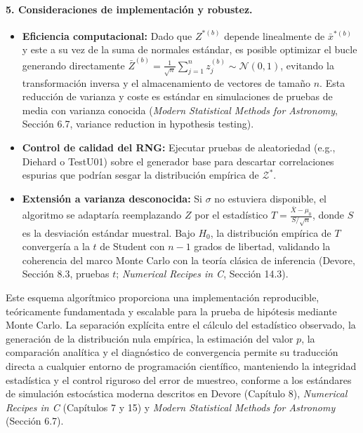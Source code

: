 \documentclass[12pt]{article}
\begin{document}
\paragraph{5. Consideraciones de implementación y robustez.}
\begin{itemize}
    \item \textbf{Eficiencia computacional:} Dado que $Z^{*(b)}$ depende linealmente de $\bar{x}^{*(b)}$ y este a su vez de la suma de normales estándar, es posible optimizar el bucle generando directamente $\bar{Z}^{(b)} = \frac{1}{\sqrt{n}} \sum_{j=1}^n z_j^{(b)} \sim \mathcal{N}(0,1)$, evitando la transformación inversa y el almacenamiento de vectores de tamaño $n$. Esta reducción de varianza y coste es estándar en simulaciones de pruebas de media con varianza conocida (\textit{Modern Statistical Methods for Astronomy}, Sección 6.7, variance reduction in hypothesis testing).
    \item \textbf{Control de calidad del RNG:} Ejecutar pruebas de aleatoriedad (e.g., Diehard o TestU01) sobre el generador base para descartar correlaciones espurias que podrían sesgar la distribución empírica de $\mathcal{Z}^*$.
    \item \textbf{Extensión a varianza desconocida:} Si $\sigma$ no estuviera disponible, el algoritmo se adaptaría reemplazando $Z$ por el estadístico $T = \frac{\bar{X} - \mu_0}{S/\sqrt{n}}$, donde $S$ es la desviación estándar muestral. Bajo $H_0$, la distribución empírica de $T$ convergería a la $t$ de Student con $n-1$ grados de libertad, validando la coherencia del marco Monte Carlo con la teoría clásica de inferencia (Devore, Sección 8.3, pruebas $t$; \textit{Numerical Recipes in C}, Sección 14.3).
\end{itemize}

Este esquema algorítmico proporciona una implementación reproducible, teóricamente fundamentada y escalable para la prueba de hipótesis mediante Monte Carlo. La separación explícita entre el cálculo del estadístico observado, la generación de la distribución nula empírica, la estimación del valor $p$, la comparación analítica y el diagnóstico de convergencia permite su traducción directa a cualquier entorno de programación científico, manteniendo la integridad estadística y el control riguroso del error de muestreo, conforme a los estándares de simulación estocástica moderna descritos en Devore (Capítulo 8), \textit{Numerical Recipes in C} (Capítulos 7 y 15) y \textit{Modern Statistical Methods for Astronomy} (Sección 6.7).
    
\end{document}
